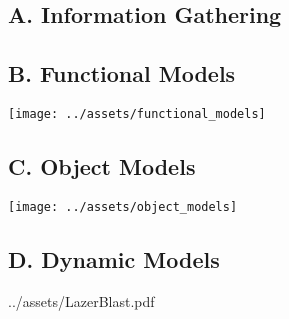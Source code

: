 %

\subsection*{A. Information Gathering}

\subsection*{B. Functional Models}
    \texttt{[image: ../assets/functional\_models]}

\subsection*{C. Object Models}
    \texttt{[image: ../assets/object\_models]}

\subsection*{D. Dynamic Models}


           {../assets/LazerBlast.pdf}
